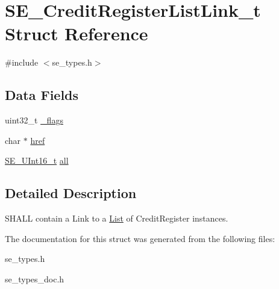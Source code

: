 \hypertarget{structSE__CreditRegisterListLink__t}{}\section{S\+E\+\_\+\+Credit\+Register\+List\+Link\+\_\+t Struct Reference}
\label{structSE__CreditRegisterListLink__t}


{\ttfamily \#include $<$se\+\_\+types.\+h$>$}

\subsection*{Data Fields}
\begin{DoxyCompactItemize}
\item 
uint32\+\_\+t \hyperlink{group__CreditRegisterListLink_ga69524ed9bcb30aa661753e0db081fe05}{\+\_\+flags}
\item 
char $\ast$ \hyperlink{group__CreditRegisterListLink_ga95b64e9f140f59d8166045d43026c5e0}{href}
\item 
\hyperlink{group__UInt16_gac68d541f189538bfd30cfaa712d20d29}{S\+E\+\_\+\+U\+Int16\+\_\+t} \hyperlink{group__CreditRegisterListLink_gaef19d5848be3a43aac4590b88bcb8b45}{all}
\end{DoxyCompactItemize}


\subsection{Detailed Description}
S\+H\+A\+LL contain a Link to a \hyperlink{structList}{List} of Credit\+Register instances. 

The documentation for this struct was generated from the following files\+:\begin{DoxyCompactItemize}
\item 
se\+\_\+types.\+h\item 
se\+\_\+types\+\_\+doc.\+h\end{DoxyCompactItemize}
